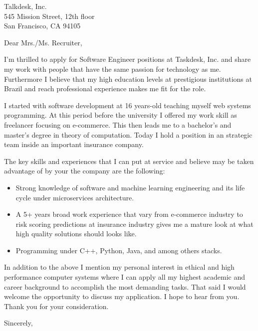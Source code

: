 \documentclass{scrlttr2}
\begin{document}
\renewcommand{\enclname}{Enclosures}

\begin{letter}{%
    Talkdesk, Inc.\\
    545 Mission Street, 12th floor\\
    San Francisco, CA 94105%
  }

  \opening{Dear Mrs./Ms. Recruiter,}

  I'm thrilled to apply for Software Engineer positions at Taskdesk, Inc. and
  share my work with people that have the same passion for technology as
  me. Furthermore I believe that my high education levels at prestigious
  institutions at Brazil and reach professional experience makes me fit for the
  role.

  I started with software development at 16 years-old teaching myself web
  systems programming. At this period before the university I offered my work
  skill as freelancer focusing on e-commerce. This then leads me to a bachelor's
  and master's degree in theory of computation. Today I hold a position in an
  strategic team inside an important insurance company.

  The key skills and experiences that I can put at service and believe may be
  taken advantage of by your the company are the following:

  \begin{itemize}
  \item Strong knowledge of software and machine learning engineering and its
    life cycle under microservices architecture.
  \item A 5+ years broad work experience that vary from e-commerce industry to
    risk scoring predictions at insurance industry gives me a mature look at
    what high quality solutions should looks like.
  \item Programming under C++, Python, Java, and among others stacks.
  \end{itemize}

  In addition to the above I mention my personal interest in ethical and high
  performance computer systems where I can apply all my highest academic and
  career background to accomplish the most demanding tasks. That said I would
  welcome the opportunity to discuss my application. I hope to hear from
  you. Thank you for your consideration.

  \closing{Sincerely,}


\end{letter}
\end{document}
